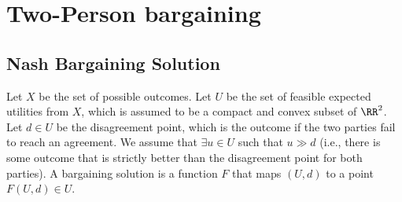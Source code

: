 \chapter{Two-Person bargaining}

\section{Nash Bargaining Solution}

Let $X$ be the set of possible outcomes. Let $U$ be the set of feasible expected utilities from $X$, which is assumed to be a compact and convex subset of $\RR^2$. Let $d\in U$ be the disagreement point, which is the outcome if the two parties fail to reach an agreement. We assume that $\exists u\in U$ such that $u \gg d$ (i.e., there is some outcome that is strictly better than the disagreement point for both parties).
A bargaining solution is a function $F$ that maps $(U, d)$ to a point $F(U,d)\in U$.





